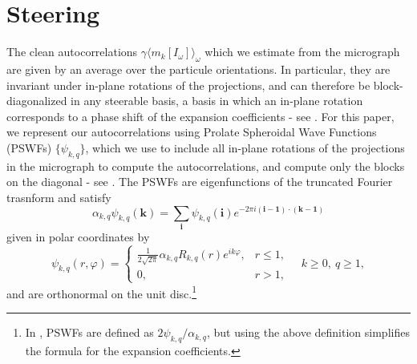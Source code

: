 \documentclass[english,11pt]{article}
\newcommand{\1}{\mathbf{1}}
\newcommand{\mb}{\mathbf}
\numberwithin{equation}{section}
\theoremstyle{plain}
\theoremstyle{definition}
\theoremstyle{remark}
\theoremstyle{plain}
\theoremstyle{remark}
\theoremstyle{plain}
\theoremstyle{plain}
\newcommand{\be}{\begin{equation}}
\newcommand{\ee}{\end{equation}}
\begin{document}
\section{Steering}\label{sec:steering}
The clean autocorrelations $\gamma\langle m_k[I_{\omega}]\rangle_{\omega}$ which we estimate from the micrograph are given by an average over the particule orientations. In particular, they are invariant under in-plane rotations of the projections, and can therefore be block-diagonalized in any steerable basis, a basis in which an in-plane rotation corresponds to a phase shift of the expansion coefficients - see \cite{bhamre2016denoising,landa2017steerable,zhao2016fast}. For this paper, we represent our autocorrelations using Prolate Spheroidal Wave Functions (PSWFs) $\{\psi_{k,q}\}$, which we use to include all in-plane rotations of the projections in the micrograph to compute the autocorrelations, and compute only the blocks on the diagonal - see \cite{landa2017steerable}. The PSWFs are eigenfunctions of the truncated Fourier trasnform and satisfy
\be\label{eq:PSWF_defn_eq}
\alpha_{k,q}\psi_{k,q}(\mb k) = \sum_{\mb i}\psi_{k,q}(\mb i)e^{-2\pi i (\mb i-\mb 1)\cdot(\mb k - \mb 1)}
\ee
given in polar coordinates by
\[ \psi_{k,q}(r,\varphi) = \left\{\begin{array}{ll} \frac{1}{2\sqrt{2\pi}}\alpha_{k,q}R_{k,q}(r)e^{ik\varphi}, & r\leq 1,\\ 0, & r>1,\end{array}\right. \quad k\geq 0,\ q\geq 1,\]
and are orthonormal on the unit disc.\footnote{In \cite{landa2017steerable}, PSWFs are defined as $2\psi_{k,q}/\alpha_{k,q}$, but using the above definition simplifies the formula for the expansion coefficients.}
\end{document}
